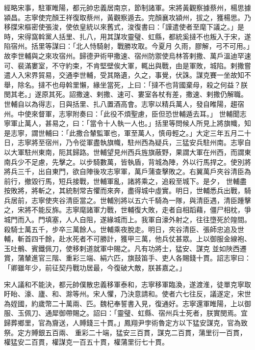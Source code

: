 \begin{pinyinscope}
 經略宋事，駐軍睢陽，都元帥忠義居南京，節制諸軍。宋將黃觀察據蔡州，楊思據潁昌。志寧使完顏王祥復取蔡州，黃觀察遁去。完顏襄攻潁州，拔之，獲楊思。乃移牒宋樞密使張浚，使依皇統以來舊式，浚復書曰：「謹遣使者至麾下議之。」是時，宋得窩斡黨人括里、扎八，用其謀攻靈璧、虹縣，都統奚撻不也叛入于宋，遂陷宿州。括里等謀曰：「北人恃騎射，戰勝攻取。今夏月
 久雨，膠解，弓不可用。」故李世輔與之來攻宿州。歸德尹術甲撒速、宿州防禦使烏林答剌撒、萬戶溫迪罕速可、裴滿婁室，不守約束，不肯堅壁俟大軍，輒出與戰，由是軍敗，城陷。剌撒嘗遣人入宋界貿易，交通李世輔，受其賂遺，久之，事覺，伏誅。謀克賽一坐故知不舉，除名。撻不也母斡里懶，緣坐當死，上曰：「撻不也背國棄母，殺之何益？朕閔其老。」遂原其死。詔撒速、剌撒、速可、婁室各杖有差，撒速、剌撒仍解職。世輔自以為得志，日與括里、扎八置酒高會。志寧以精兵萬人，發自睢陽，趨宿州。中使來督軍，志寧附奏曰：「此役不煩聖慮，臣但恐世輔遁去耳。」
 世輔聞志寧軍止萬人，甚易之，曰：「當令十人執一人也。」括里等問候人所見上將旗幟，知是志寧，謂世輔曰：「此撒合輦監軍也，軍至萬人，慎毋輕之。」大定三年五月二十日，志寧將至宿州，乃令從軍盡執旗幟，駐州西為疑兵，三猛安兵駐州南。志寧自以大軍駐州東南，阨其歸路。世輔望見州西兵旌旗蔽野，果謂大軍在州西，而謂東南兵少不足慮，先擊之。以步騎數萬，皆執盾，背城為陣，外以行馬捍之。使別將將兵三千，出自東門，欲自陣後攻志寧軍，萬戶蒲查擊敗之。右翼萬戶夾谷清臣為前行，撤毀行馬，短兵接戰，世輔軍亂，諸將乘之，追殺至城下。是夕，
 世輔盡按敗將，將斬之，其統制常吉懼而來奔，盡得城中虛實。明日，世輔悉兵出戰，騎兵居前，志寧使夾谷清臣當之。世輔別將以五六千騎為一隊，與清臣遇，清臣踵擊之，宋將不能反旆。志寧麾諸軍力戰，世輔復大敗，走者自相蹈藉，僵尸相枕，爭城門而入。門填塞，人人自阻，遂緣城而上。我軍自濠外射之，往往墮死於隍間。殺騎士萬五千，步卒三萬餘人。世輔乘夜脫走。明日，夾谷清臣、張師忠追及世輔，斬首四千餘，赴水死者不可勝計，獲甲三萬，他兵仗甚眾。上以御服金線袍、玉吐鶻、賓鐵佩刀，使移剌道就軍中賜之。凡有功將士，猛安、謀克
 並如陜西遷賞，蒲輦進官三階、重彩三端、絹六匹，旗鼓笛手、吏人各賜錢十貫。詔志寧曰：「卿雖年少，前征契丹戰功居最，今復破大敵，朕甚嘉之。」



 宋人議和不能決，都元帥僕散忠義移軍泰和，志寧移軍臨渙，遂渡淮，徒單克寧取盱眙、濠、廬、和、滁等州。宋人懼，乃決意請和。使者六七往反，議遂定，宋世為姪國，約歲幣二十萬兩、匹。魏杞奉誓書入見，復通好。志寧還軍睢陽，上以御服、玉佩刀、通犀御帶賜之。詔曰：「靈璧、虹縣、宿州兵士死者，朕實閔焉。宜歸葬鄉里，官為齎送，人賻錢三十貫。」鳳翔尹孛術魯定方以下猛安謀克，官為致祭。定方賻銀五百兩、
 重彩二十端，猛安三百貫，謀克二百貫，蒲里衍一百貫，權猛安二百貫，權謀克一百五十貫，權蒲里衍七十貫。




\end{pinyinscope}
